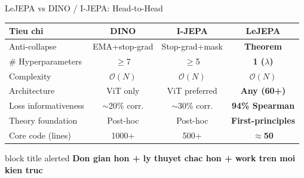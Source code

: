\documentclass[aspectratio=169,12pt]{beamer}
\newcommand{\takeaway}[1]{%
  \vfill
  \begin{beamercolorbox}[sep=4pt,center,rounded=true]{block title alerted}
    \small\bfseries #1
  \end{beamercolorbox}
}
\newcommand{\good}[1]{\textcolor{good}{#1}}
\begin{document}
\begin{frame}{LeJEPA vs DINO / I-JEPA: Head-to-Head}
\begin{center}
\begin{tabular}{lccc}
\toprule
\textbf{Tieu chi} & \textbf{DINO} & \textbf{I-JEPA} & \textbf{LeJEPA} \\
\midrule
Anti-collapse
  & \cellcolor{lightred}EMA+stop-grad
  & \cellcolor{lightred}Stop-grad+mask
  & \cellcolor{lightgreen}\good{\textbf{Theorem}} \\[3pt]
\# Hyperparameters
  & \cellcolor{lightred}$\geq$7
  & \cellcolor{lightred}$\geq$5
  & \cellcolor{lightgreen}\good{\textbf{1 ($\lambda$)}} \\[3pt]
Complexity
  & $\mathcal{O}(N)$
  & $\mathcal{O}(N)$
  & \cellcolor{lightgreen}\good{$\mathcal{O}(N)$} \\[3pt]
Architecture
  & \cellcolor{lightred}ViT only
  & \cellcolor{lightred}ViT preferred
  & \cellcolor{lightgreen}\good{\textbf{Any (60+)}} \\[3pt]
Loss informativeness
  & \cellcolor{lightred}$\sim$20\% corr.
  & \cellcolor{lightred}$\sim$30\% corr.
  & \cellcolor{lightgreen}\good{\textbf{94\% Spearman}} \\[3pt]
Theory foundation
  & \cellcolor{lightred}Post-hoc
  & \cellcolor{lightred}Post-hoc
  & \cellcolor{lightgreen}\good{\textbf{First-principles}} \\[3pt]
Core code (lines)
  & \cellcolor{lightred}1000+
  & \cellcolor{lightred}500+
  & \cellcolor{lightgreen}\good{\textbf{$\approx$50}} \\
\bottomrule
\end{tabular}
\end{center}
\takeaway{Don gian hon + ly thuyet chac hon + work tren moi kien truc}
\end{frame}
\end{document}
